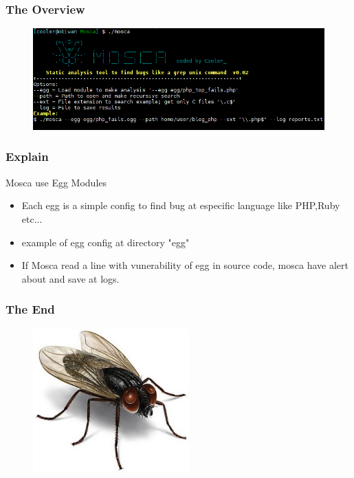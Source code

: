 \documentclass[serif,mathserif]{beamer}
\begin{document}
\begin{frame}
  \frametitle{The Overview}
  \begin{figure}[]    
    \centering
    \includegraphics[width=14cm]{images/codeview.png} 
  \end{figure}
\end{frame}


\begin{frame}
  \frametitle{Explain}
  Mosca use Egg Modules
  \begin{itemize}
  \item Each egg is a simple config to find bug at especific language like PHP,Ruby etc...
  \item example of egg config at directory "egg"
  \item If Mosca read a line with vunerability of egg in source code, mosca have alert about and save at logs.
  \end{itemize}
\end{frame}


\begin{frame}
  \frametitle{The End}
  \begin{figure}[]    
    \centering
    \includegraphics[width=6cm]{images/mosca.jpg} 
  \end{figure}
\end{frame}



\end{document}
